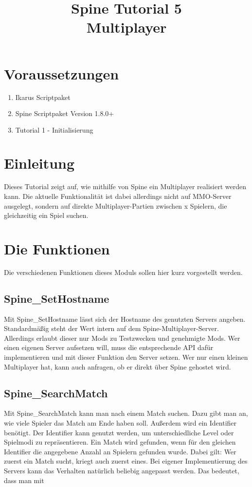 \documentclass{article}
\title{Spine Tutorial 5 \\ Multiplayer}
\begin{document}
\section{Voraussetzungen}

\begin{enumerate}
\item Ikarus Scriptpaket
\item Spine Scriptpaket Version 1.8.0+
\item Tutorial 1 - Initialisierung
\end{enumerate}

\section{Einleitung}

Dieses Tutorial zeigt auf, wie mithilfe von Spine ein Multiplayer realisiert werden kann. Die aktuelle Funktionalität ist dabei allerdings nicht auf MMO-Server ausgelegt, sondern auf direkte Multiplayer-Partien zwischen x Spielern, die gleichzeitig ein Spiel suchen.

\section{Die Funktionen}

Die verschiedenen Funktionen dieses Moduls sollen hier kurz vorgestellt werden.

\subsection{Spine\_SetHostname}

Mit Spine\_SetHostname lässt sich der Hostname des genutzten Servers angeben. Standardmäßig steht der Wert intern auf dem Spine-Multiplayer-Server. Allerdings erlaubt dieser nur Mods zu Testzwecken und genehmigte Mods. Wer einen eigenen Server aufsetzen will, muss die entsprechende API dafür implementieren und mit dieser Funktion den Server setzen. Wer nur einen kleinen Multiplayer hat, kann auch anfragen, ob er direkt über Spine gehostet wird.

\subsection{Spine\_SearchMatch}

Mit Spine\_SearchMatch kann man nach einem Match suchen. Dazu gibt man an, wie viele Spieler das Match am Ende haben soll. Außerdem wird ein Identifier benötigt. Der Identifier kann genutzt werden, um unterschiedliche Level oder Spielmodi zu repräsentieren. Ein Match wird gefunden, wenn für den gleichen Identifier die angegebene Anzahl an Spielern gefunden wurde. Dabei gilt: Wer zuerst ein Match sucht, kriegt auch zuerst eines. Bei eigener Implementierung des Servers kann das Verhalten natürlich beliebig angepasst werden. Das bedeutet, dass man mit
\end{document}
